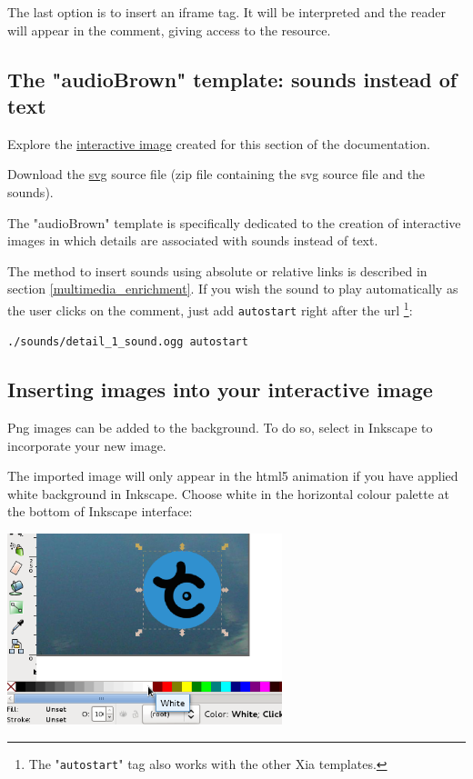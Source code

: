 The last option is to insert an iframe tag.
It will be interpreted and the reader will appear in the comment, 
giving access to the resource.

\subsection{The "audioBrown" template: sounds instead of text}\label{audioBrownsection}

\begin{links}
Explore the \href{http://xia.dane.ac-versailles.fr/demo/tuto/xia4}{interactive image} created for this section of the documentation.

Download the \href{http://xia.dane.ac-versailles.fr/demo/tuto/xia4/svg/xia4.zip}{svg} source file (zip file containing the svg source file
and the sounds).
\end{links}

The "audioBrown" template is specifically dedicated to the creation of 
interactive images in which details are associated with sounds instead of text.

The method to insert sounds using absolute or relative links is described in 
section 
\ref{multimedia_enrichment}. If you wish the sound to play 
automatically as the user clicks on the comment, just add \verb|autostart| right 
after the url \footnote{The "\texttt{autostart}" tag also works with the other 
Xia templates.}:\\
\begin{center}
 \verb|./sounds/detail_1_sound.ogg autostart|
\end{center}


\subsection{Inserting images into your interactive image}\label{insertion_images}

Png images can be added to the background. To do so, select  in 
Inkscape to incorporate your new image.

The imported image will only appear in the html5 animation if you have applied white background in 
Inkscape. Choose white in the horizontal colour palette at the bottom of 
Inkscape interface:\\

\begin{center}
\includegraphics[width=0.6\textwidth]{images/white_fill}\\ 
\end{center}


